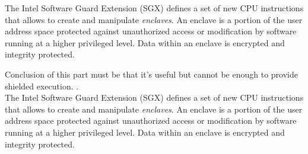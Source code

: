 The Intel Software Guard Extension (SGX) defines a set of new CPU instructions that allows to create and manipulate \emph{enclaves}.
An enclave is a portion of the user address space protected against unauthorized access or modification by software running at a higher privileged level.
Data within an enclave is encrypted and integrity protected.


%
%
%
%
 
Conclusion of this part must be that it's useful but cannot be enough to provide shielded execution.
.\\



The Intel Software Guard Extension (SGX) defines a set of new CPU instructions that allows to create and manipulate \emph{enclaves}.
An enclave is a portion of the user address space protected against unauthorized access or modification by software running at a higher privileged level.
Data within an enclave is encrypted and integrity protected.


